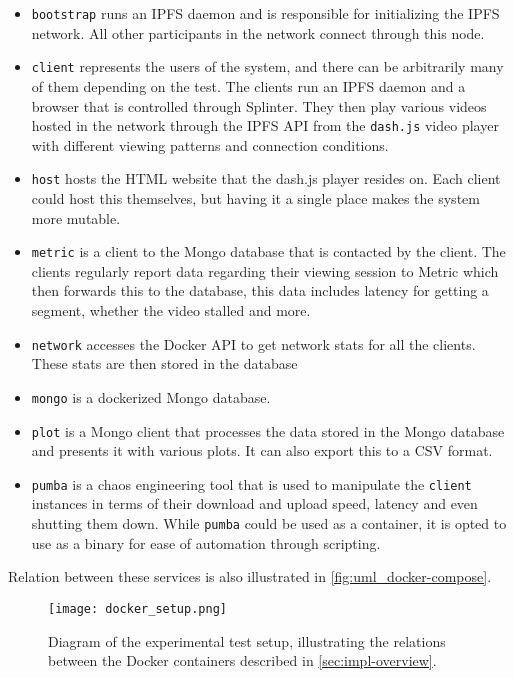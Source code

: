 \begin{itemize}
    \item \texttt{bootstrap} runs an \ac{IPFS} daemon and is responsible for initializing the \ac{IPFS} network. All other participants in the network connect through this node.
    \item \texttt{client} represents the users of the system, and there can be arbitrarily many of them depending on the test. The clients run an \ac{IPFS} daemon and a browser that is controlled through Splinter. They then play various videos hosted in the network through the \ac{IPFS} \ac{API} from the \texttt{dash.js} video player with different viewing patterns and connection conditions.
    \item \texttt{host} hosts the \ac{HTML} website that the dash.js player resides on. Each client could host this themselves, but having it a single place makes the system more mutable.
    \item \texttt{metric} is a client to the Mongo database that is contacted by the client. The clients regularly report data regarding their viewing session to Metric which then forwards this to the database, this data includes latency for getting a segment, whether the video stalled and more.
    \item \texttt{network} accesses the Docker \ac{API} to get network stats for all the clients. These stats are then stored in the database
    \item \texttt{mongo} is a dockerized Mongo database.
    \item \texttt{plot} is a Mongo client that processes the data stored in the Mongo database and presents it with various plots. It can also export this to a \ac{CSV} format.
    \item \texttt{pumba} is a chaos engineering tool that is used to manipulate the \texttt{client} instances in terms of their download and upload speed, latency and even shutting them down. While \texttt{pumba} could be used as a container, it is opted to use as a binary for ease of automation through scripting.
\end{itemize}
Relation between these services is also illustrated in \autoref{fig:uml_docker-compose}.

\begin{figure}[bth]
    \texttt{[image: docker\_setup.png]}
    \caption[Diagram of the experimental test setup]{Diagram of the experimental test setup, illustrating the relations between the Docker containers described in \autoref{sec:impl-overview}.}
    \label{fig:uml_docker-compose}
\end{figure}

